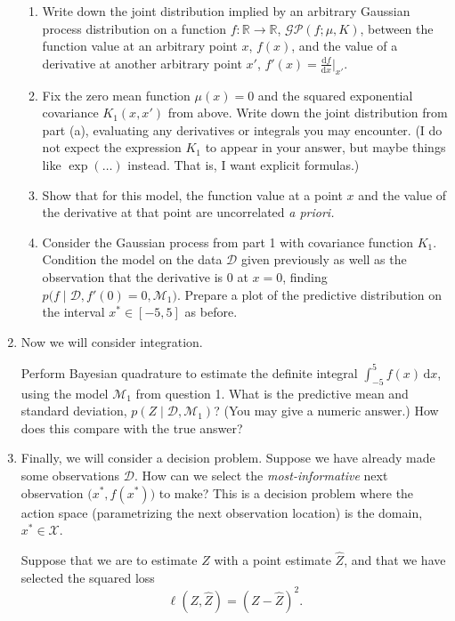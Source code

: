 \documentclass{article}
\newcommand{\given}{\mid}
\newcommand{\mc}[1]{\mathcal{#1}}
\newcommand{\data}{\mc{D}}
\newcommand{\model}{\mc{M}}
\newcommand{\intd}[1]{\,\mathrm{d}{#1}}
\begin{document}
\begin{enumerate}
  \begin{enumerate}
  \item
    Write down the joint distribution implied by an arbitrary Gaussian
    process distribution on a function $f\colon \mathbb{R} \to
    \mathbb{R}$, $\mc{GP}(f; \mu, K)$, between the function value at
    an arbitrary point $x$, $f(x)$, and the value of a derivative at
    another arbitrary point $x'$, $f'(x) =
    \frac{\mathrm{d}f}{\mathrm{d}x} \rvert_{x'}$.
  \item
    Fix the zero mean function $\mu(x) = 0$ and the squared
    exponential covariance $K_1(x, x')$ from above. Write down the
    joint distribution from part (a), evaluating any derivatives or
    integrals you may encounter. (I do not expect the expression $K_1$
    to appear in your answer, but maybe things like $\exp(\dots)$
    instead. That is, I want explicit formulas.)
  \item
    Show that for this model, the function value at a point $x$ and
    the value of the derivative at that point are uncorrelated \emph{a
      priori.}
  \item
    Consider the Gaussian process from part 1 with covariance function
    $K_1$. Condition the model on the data $\data$ given previously as
    well as the observation that the derivative is $0$ at $x = 0$,
    finding $p\bigl(f \given \data, f'(0) = 0,
    \model_1\bigr)$. Prepare a plot of the predictive distribution on
    the interval $x^\ast \in [-5, 5]$ as before.
  \end{enumerate}

\item
  Now we will consider integration.

  Perform Bayesian quadrature to estimate the definite integral
  $\int_{-5}^5 f(x) \intd{x}$, using the model $\model_1$ from
  question 1.  What is the predictive mean and standard deviation,
  $p(Z \given \data, \model_1)$?  (You may give a numeric answer.)
  How does this compare with the true answer?

\item
  Finally, we will consider a decision problem. Suppose we have
  already made some observations $\data$.  How can we select the
  \emph{most-informative} next observation $\bigl(x^\ast,
  f(x^\ast)\bigr)$ to make?  This is a decision problem where the
  action space (parametrizing the next observation location) is the
  domain, $x^\ast \in \mc{X}$.

  Suppose that we are to estimate $Z$ with a point estimate $\hat{Z}$,
  and that we have selected the squared loss
  \[\ell(Z, \hat{Z}) = (Z - \hat{Z})^2.\]


\end{enumerate}
\end{document}

